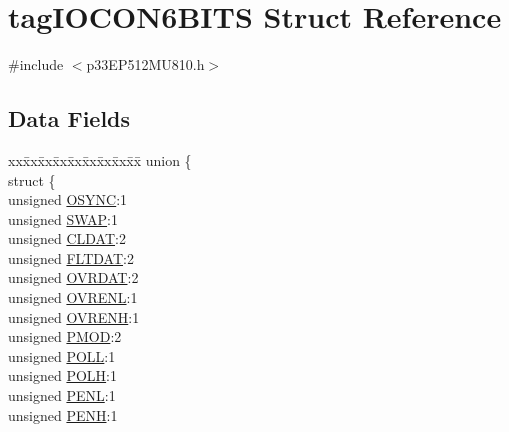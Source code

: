\hypertarget{structtag_i_o_c_o_n6_b_i_t_s}{}\section{tag\+I\+O\+C\+O\+N6\+B\+I\+TS Struct Reference}
\label{structtag_i_o_c_o_n6_b_i_t_s}


{\ttfamily \#include $<$p33\+E\+P512\+M\+U810.\+h$>$}

\subsection*{Data Fields}
\begin{DoxyCompactItemize}
\item 
\begin{tabbing}
xx\=xx\=xx\=xx\=xx\=xx\=xx\=xx\=xx\=\kill
union \{\\
\>struct \{\\
\>\>unsigned \hyperlink{structtag_i_o_c_o_n6_b_i_t_s_aee7f35d5d04fcd5202b9d569e0d08146}{OSYNC}:1\\
\>\>unsigned \hyperlink{structtag_i_o_c_o_n6_b_i_t_s_a3ed0654ceb192d32e26d2929c9b8dcc2}{SWAP}:1\\
\>\>unsigned \hyperlink{structtag_i_o_c_o_n6_b_i_t_s_a5bcbfaa85bc9c3349fb4e269aa308899}{CLDAT}:2\\
\>\>unsigned \hyperlink{structtag_i_o_c_o_n6_b_i_t_s_afcc1e84f8b5860ae56a567b5de96af73}{FLTDAT}:2\\
\>\>unsigned \hyperlink{structtag_i_o_c_o_n6_b_i_t_s_a6d82e38a9acf634763a64a6876f58d3d}{OVRDAT}:2\\
\>\>unsigned \hyperlink{structtag_i_o_c_o_n6_b_i_t_s_a2e98ef1aea75144311343faf9f705f2d}{OVRENL}:1\\
\>\>unsigned \hyperlink{structtag_i_o_c_o_n6_b_i_t_s_a0e87b6433e91b1b0d550e9419e22b408}{OVRENH}:1\\
\>\>unsigned \hyperlink{structtag_i_o_c_o_n6_b_i_t_s_a4a7369a55430f3368fb601d87d479553}{PMOD}:2\\
\>\>unsigned \hyperlink{structtag_i_o_c_o_n6_b_i_t_s_a269dd0694f25a7b4dd065f3570e09b5e}{POLL}:1\\
\>\>unsigned \hyperlink{structtag_i_o_c_o_n6_b_i_t_s_a21a3881dcaa3ce8bccd5d9906aee8e55}{POLH}:1\\
\>\>unsigned \hyperlink{structtag_i_o_c_o_n6_b_i_t_s_af777eadaa0b86bb09cad6117a36e15aa}{PENL}:1\\
\>\>unsigned \hyperlink{structtag_i_o_c_o_n6_b_i_t_s_a91f04ec56f33e5a2e402f3817a44e91d}{PENH}:1\\

\end{tabbing}
\end{DoxyCompactItemize}
